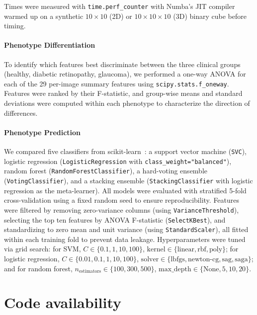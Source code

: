 \documentclass[11pt]{article}
\begin{document}
Times were measured with \texttt{time.perf\_counter} with Numba's JIT
compiler warmed up on a synthetic $10\times10$ (2D) or
$10\times10\times10$ (3D) binary cube before timing.

\paragraph{Phenotype Differentiation}\label{sec:methods:setup:phenodiff}

To identify which features best discriminate between the three
clinical groups (healthy, diabetic retinopathy, glaucoma), we
performed a one-way ANOVA for each of the 29 per-image summary
features using \texttt{scipy.stats.f\_oneway}. Features were ranked
by their F-statistic, and group-wise means and standard deviations
were computed within each phenotype to characterize the direction of
differences.

\paragraph{Phenotype Prediction}\label{sec:methods:setup:phenoclass}

We compared five classifiers from scikit-learn~\cite{sklearn}: a
support vector machine (\texttt{SVC}), logistic regression
(\texttt{LogisticRegression} with \texttt{class\_weight="balanced"}),
random forest (\texttt{RandomForestClassifier}), a hard-voting
ensemble (\texttt{VotingClassifier}), and a stacking ensemble
(\texttt{StackingClassifier} with logistic regression as the
meta-learner). All models were evaluated with stratified 5-fold
cross-validation using a fixed random seed to ensure reproducibility.
Features were filtered by removing zero-variance columns (using
\texttt{VarianceThreshold}), selecting the top ten features by ANOVA
F-statistic (\texttt{SelectKBest}), and standardizing to zero mean
and unit variance (using \texttt{StandardScaler}), all fitted within
each training fold to prevent data leakage. Hyperparameters were
tuned via grid search: for SVM, $C \in \{0.1, 1, 10, 100\}$,
$\text{kernel} \in \{\text{linear}, \text{rbf}, \text{poly}\}$; for
logistic regression, $C \in \{0.01, 0.1, 1, 10, 100\}$,
$\text{solver} \in \{\text{lbfgs}, \text{newton-cg}, \text{sag},
\text{saga}\}$; and for random forest, $n_{\text{estimators}} \in
\{100, 300, 500\}$, $\text{max\_depth} \in \{\text{None}, 5, 10, 20\}$.

\section{Code availability}\label{sec:code}
\end{document}
